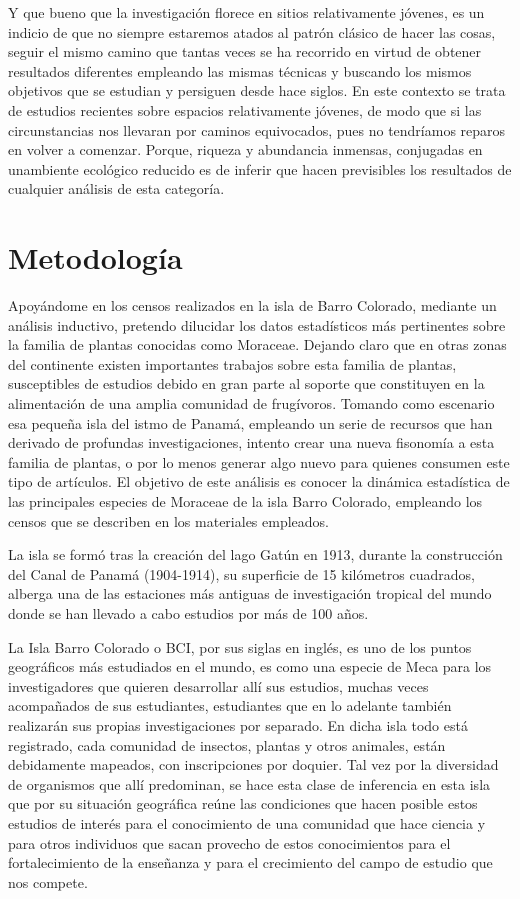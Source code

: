 \documentclass[11pt,]{article}
\begin{document}
Y que bueno que la investigación florece en sitios relativamente
jóvenes, es un indicio de que no siempre estaremos atados al patrón
clásico de hacer las cosas, seguir el mismo camino que tantas veces se
ha recorrido en virtud de obtener resultados diferentes empleando las
mismas técnicas y buscando los mismos objetivos que se estudian y
persiguen desde hace siglos. En este contexto se trata de estudios
recientes sobre espacios relativamente jóvenes, de modo que si las
circunstancias nos llevaran por caminos equivocados, pues no tendríamos
reparos en volver a comenzar. Porque, riqueza y abundancia inmensas,
conjugadas en unambiente ecológico reducido es de inferir que hacen
previsibles los resultados de cualquier análisis de esta categoría.

\section{Metodología}\label{metodologuxeda}

Apoyándome en los censos realizados en la isla de Barro Colorado,
mediante un análisis inductivo, pretendo dilucidar los datos
estadísticos más pertinentes sobre la familia de plantas conocidas como
Moraceae. Dejando claro que en otras zonas del continente existen
importantes trabajos sobre esta familia de plantas, susceptibles de
estudios debido en gran parte al soporte que constituyen en la
alimentación de una amplia comunidad de frugívoros. Tomando como
escenario esa pequeña isla del istmo de Panamá, empleando un serie de
recursos que han derivado de profundas investigaciones, intento crear
una nueva fisonomía a esta familia de plantas, o por lo menos generar
algo nuevo para quienes consumen este tipo de artículos. El objetivo de
este análisis es conocer la dinámica estadística de las principales
especies de Moraceae de la isla Barro Colorado, empleando los censos que
se describen en los materiales empleados.

La isla se formó tras la creación del lago Gatún en 1913, durante la
construcción del Canal de Panamá (1904-1914), su superficie de 15
kilómetros cuadrados, alberga una de las estaciones más antiguas de
investigación tropical del mundo donde se han llevado a cabo estudios
por más de 100 años.

La Isla Barro Colorado o BCI, por sus siglas en inglés, es uno de los
puntos geográficos más estudiados en el mundo, es como una especie de
Meca para los investigadores que quieren desarrollar allí sus estudios,
muchas veces acompañados de sus estudiantes, estudiantes que en lo
adelante también realizarán sus propias investigaciones por separado. En
dicha isla todo está registrado, cada comunidad de insectos, plantas y
otros animales, están debidamente mapeados, con inscripciones por
doquier. Tal vez por la diversidad de organismos que allí predominan, se
hace esta clase de inferencia en esta isla que por su situación
geográfica reúne las condiciones que hacen posible estos estudios de
interés para el conocimiento de una comunidad que hace ciencia y para
otros individuos que sacan provecho de estos conocimientos para el
fortalecimiento de la enseñanza y para el crecimiento del campo de
estudio que nos compete.
\end{document}

